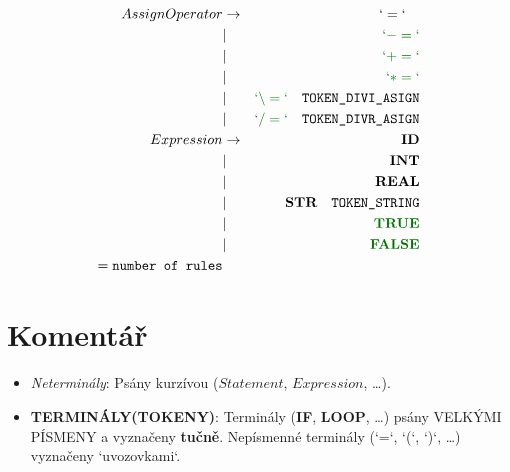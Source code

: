 \documentclass[a4paper,11pt,landscape,leqno]{article}
\begin{document}
\begin{eqnarray}
AssignOperator  &    \rightarrow    &    `=` \quad      \\
        &   |       &   \textcolor{green1}{`-=`}    \\
        &   |       &   \textcolor{green1}{`+=`}    \\
        &   |       &   \textcolor{green1}{`*=`}    \\
        &   |       &   \textcolor{green1}{`\backslash =`}\quad \textrm{\texttt{TOKEN\_DIVI\_ASIGN}}    \\
        &   |       &   \textcolor{green1}{`/=`}\quad \textrm{\texttt{TOKEN\_DIVR\_ASIGN}}\\
Expression &    \rightarrow    & \textbf{ID}    \\
        &   |       &   \textbf{INT}    \\
        &   |       &   \textbf{REAL}   \\
        &   |       &   \textbf{STR}\quad \textrm{\texttt{TOKEN\_STRING}} \\
        &   |       &   \textcolor{green1}{\textbf{TRUE}}    \\
        &   |       &   \textcolor{green1}{\textbf{FALSE}}    \\
 = \textrm{\texttt{number of rules}} & & 
\end{eqnarray}

\section{Komentář}
\begin{itemize}
\item{\emph{Neterminály}: Psány kurzívou ($Statement$, $Expression$, \dots).}
\item{\textbf{TERMINÁLY(TOKENY)}: Terminály (\textbf{IF}, \textbf{LOOP}, \dots) psány VELKÝMI PÍSMENY a vyznačeny \textbf{tučně}. Nepísmenné terminály (`=`, `(`, `)`, \dots) vyznačeny `uvozovkami`.}
\end{itemize}
\enddocument
\end{document}
